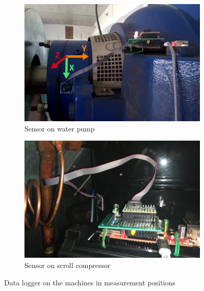 \begin{figure}[h]
    \centering
    \begin{subfigure}[b]{0.49\textwidth}
        \includegraphics[width=\textwidth]{assets/design/sensor/sensor.jpg}
        \caption{Sensor on water pump}
    \end{subfigure}
    \hfill
    \begin{subfigure}[b]{0.49\textwidth}
        \includegraphics[width=\textwidth]{assets/design/sensor/sensor-compressor.jpg}
        \caption{Sensor on scroll compressor}
    \end{subfigure}
    \caption{Data logger on the machines in measurement positions}
\end{figure}
